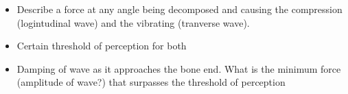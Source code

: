\begin{itemize}
    \item Describe a force at any angle being decomposed and causing the compression (logintudinal wave) and the vibrating (tranverse wave).
    \item Certain threshold of perception for both
    \item Damping of wave as it approaches the bone end. What is the minimum force (amplitude of wave?) that surpasses the threshold of perception
\end{itemize}

